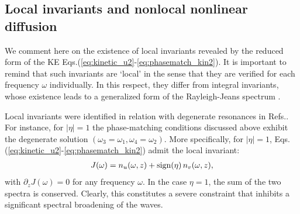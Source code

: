 \documentclass[pra,twocolumn,showpacs,preprintnumbers,amsmath,amssymb]{revtex4}
\begin{document}
\subsection{Local invariants and nonlocal nonlinear diffusion}
\label{sec:local_inv}

We  comment here on the existence of local invariants revealed by the reduced form of the KE Eqs.(\ref{eq:kinetic_u2}-\ref{eq:phasematch_kin2}).
It is important to remind that such invariants are `local' in the sense that they are verified for each frequency $\omega$ individually.
In this respect, they differ from integral invariants, whose existence leads to a generalized form of the Rayleigh-Jeans  spectrum \cite{PRL10}.

Local invariants were identified in relation with degenerate resonances in Refs.\cite{PRL10,OL10,PR14}.
For instance, for $|\eta|=1$ the phase-matching conditions discussed above exhibit the degenerate solution $(\omega_3=\omega_1, \omega_4=\omega_2)$. 
More specifically, for $|\eta|=1$, Eqs.(\ref{eq:kinetic_u2}-\ref{eq:phasematch_kin2}) admit the local invariant:
\begin{eqnarray}
J(\omega) = n_u(\omega,z) + {\rm sign}(\eta) \, n_v(\omega,z),
\end{eqnarray}
with $\partial_z J(\omega) = 0$ for any frequency $\omega$.
In the case $\eta = 1$, the sum of the two spectra is conserved. Clearly, this constitutes a  severe constraint that inhibits a significant spectral broadening of the waves.
\end{document}
